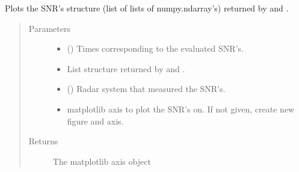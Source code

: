 \documentclass[letterpaper,10pt,english]{sphinxmanual}
\begin{document}
\begin{fulllineitems}
\label{\detokenize{modules/simulate_tracking:simulate_tracking.plot_snr}}
Plots the SNR’s structure (list of lists of numpy.ndarray’s) returned by {\hyperref[\detokenize{modules/simulate_tracking:simulate_tracking.get_track_snr}]{}} and {\hyperref[\detokenize{modules/simulate_tracking:simulate_tracking.get_scan_snr}]{}}.
\begin{quote}\begin{description}
\item[{Parameters}] \leavevmode\begin{itemize}
\item {} 
 () \textendash{} Times corresponding to the evaluated SNR’s.

\item {} 
 \textendash{} List structure returned by {\hyperref[\detokenize{modules/simulate_tracking:simulate_tracking.get_track_snr}]{}} and {\hyperref[\detokenize{modules/simulate_tracking:simulate_tracking.get_scan_snr}]{}}.

\item {} 
 ({\hyperref[\detokenize{modules/radar_config:radar_config.RadarSystem}]{}}) \textendash{} Radar system that measured the SNR’s.

\item {} 
 \textendash{} matplotlib axis to plot the SNR’s on. If not given, create new figure and axis.

\end{itemize}

\item[{Returns}] \leavevmode
The matplotlib axis object

\end{description}\end{quote}

\end{fulllineitems}
\end{document}
